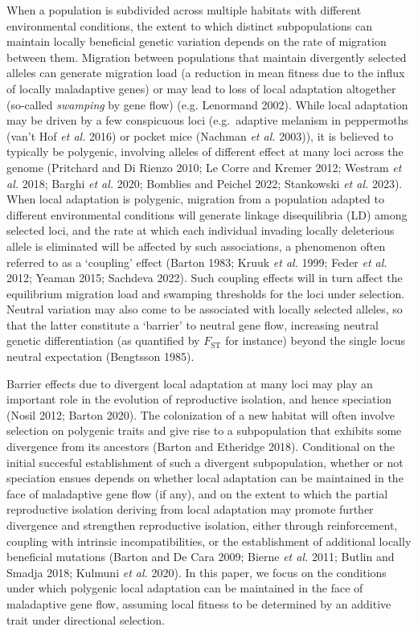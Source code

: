 \documentclass[
  11pt,
]{article}
\begin{document}
When a population is subdivided across multiple habitats with different
environmental conditions, the extent to which distinct subpopulations
can maintain locally beneficial genetic variation depends on the rate of
migration between them. Migration between populations that maintain
divergently selected alleles can generate migration load (a reduction in
mean fitness due to the influx of locally maladaptive genes) or may lead
to loss of local adaptation altogether (so-called \emph{swamping} by
gene flow) (e.g. Lenormand 2002). While local adaptation may be driven
by a few conspicuous loci (e.g.~adaptive melanism in peppermoths (van't
Hof \emph{et al.} 2016) or pocket mice (Nachman \emph{et al.} 2003)), it
is believed to typically be polygenic, involving alleles of different
effect at many loci across the genome (Pritchard and Di Rienzo 2010; Le
Corre and Kremer 2012; Westram \emph{et al.} 2018; Barghi \emph{et al.}
2020; Bomblies and Peichel 2022; Stankowski \emph{et al.} 2023). When
local adaptation is polygenic, migration from a population adapted to
different environmental conditions will generate linkage disequilibria
(LD) among selected loci, and the rate at which each individual invading
locally deleterious allele is eliminated will be affected by such
associations, a phenomenon often referred to as a `coupling' effect
(Barton 1983; Kruuk \emph{et al.} 1999; Feder \emph{et al.} 2012; Yeaman
2015; Sachdeva 2022). Such coupling effects will in turn affect the
equilibrium migration load and swamping thresholds for the loci under
selection. Neutral variation may also come to be associated with locally
selected alleles, so that the latter constitute a `barrier' to neutral
gene flow, increasing neutral genetic differentiation (as quantified by
\(F_{\mathrm{ST}}\) for instance) beyond the single locus neutral
expectation (Bengtsson 1985).

Barrier effects due to divergent local adaptation at many loci may play
an important role in the evolution of reproductive isolation, and hence
speciation (Nosil 2012; Barton 2020). The colonization of a new habitat
will often involve selection on polygenic traits and give rise to a
subpopulation that exhibits some divergence from its ancestors (Barton
and Etheridge 2018). Conditional on the initial succesful establishment
of such a divergent subpopulation, whether or not speciation ensues
depends on whether local adaptation can be maintained in the face of
maladaptive gene flow (if any), and on the extent to which the partial
reproductive isolation deriving from local adaptation may promote
further divergence and strengthen reproductive isolation, either through
reinforcement, coupling with intrinsic incompatibilities, or the
establishment of additional locally beneficial mutations (Barton and De
Cara 2009; Bierne \emph{et al.} 2011; Butlin and Smadja 2018; Kulmuni
\emph{et al.} 2020). In this paper, we focus on the conditions under
which polygenic local adaptation can be maintained in the face of
maladaptive gene flow, assuming local fitness to be determined by an
additive trait under directional selection.
\end{document}
